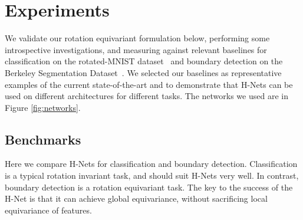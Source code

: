 \documentclass[10pt,twocolumn,letterpaper]{article}
\begin{document}
\section{Experiments}
We validate our rotation equivariant formulation below, performing
some introspective investigations, and measuring against relevant
baselines for classification on the rotated-MNIST dataset~\cite{larochelle2007deep} 
and boundary detection on the Berkeley Segmentation Dataset~\cite{arbelaez2011bsd}.
We selected our baselines as representative examples of the current 
state-of-the-art and to demonstrate that H-Nets can be used on different 
architectures for different tasks. The networks we used are in Figure \ref{fig:networks}.

\subsection{Benchmarks}
Here we compare H-Nets for classification and boundary detection. 
Classification is a typical rotation invariant task, and should 
suit H-Nets very well. In contrast, boundary detection is a rotation 
equivariant task. The key to the success of the H-Net is that it can achieve
global equivariance, without sacrificing local equivariance of features.
\end{document}
